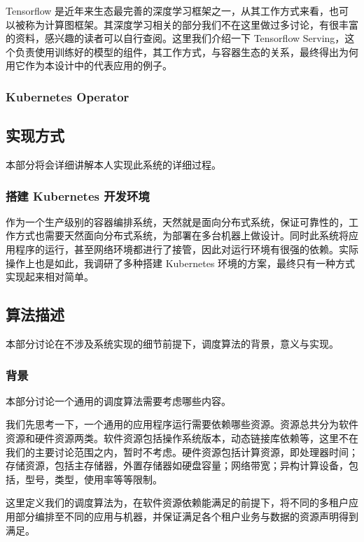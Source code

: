 Tensorflow 是近年来生态最完善的深度学习框架之一，从其工作方式来看，也可以被称为计算图框架。其深度学习相关的部分我们不在这里做过多讨论，有很丰富的资料，感兴趣的读者可以自行查阅。这里我们介绍一下 Tensorflow Serving，这个负责使用训练好的模型的组件，其工作方式，与容器生态的关系，最终得出为何用它作为本设计中的代表应用的例子。

\subsubsection{Kubernetes Operator}

\subsection{实现方式}

本部分将会详细讲解本人实现此系统的详细过程。

\subsubsection{搭建 Kubernetes 开发环境}

作为一个生产级别的容器编排系统，天然就是面向分布式系统，保证可靠性的，工作方式也需要天然面向分布式系统，为部署在多台机器上做设计。同时此系统将应用程序的运行，甚至网络环境都进行了接管，因此对运行环境有很强的依赖。实际操作上也是如此，我调研了多种搭建 Kubernetes 环境的方案，最终只有一种方式实现起来相对简单。

\subsection{算法描述}

本部分讨论在不涉及系统实现的细节前提下，调度算法的背景，意义与实现。

\subsubsection{背景}

本部分讨论一个通用的调度算法需要考虑哪些内容。

我们先思考一下，一个通用的应用程序运行需要依赖哪些资源。资源总共分为软件资源和硬件资源两类。软件资源包括操作系统版本，动态链接库依赖等，这里不在我们的主要讨论范围之内，暂时不考虑。硬件资源包括计算资源，即处理器时间；存储资源，包括主存储器，外置存储器如硬盘容量；网络带宽；异构计算设备，包括，型号，类型，使用率等等限制。

这里定义我们的调度算法为，在软件资源依赖能满足的前提下，将不同的多租户应用部分编排至不同的应用与机器，并保证满足各个租户业务与数据的资源声明得到满足。

